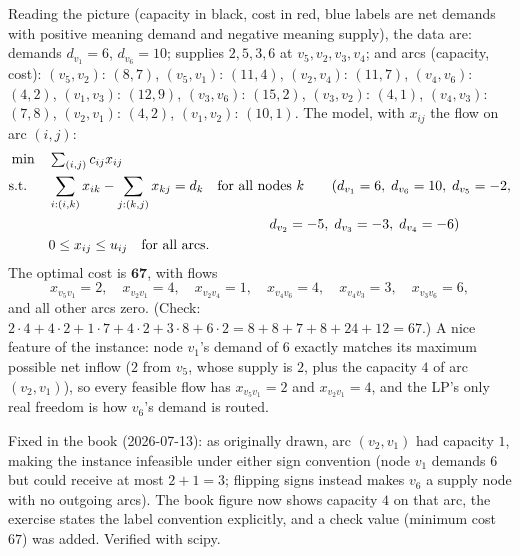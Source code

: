 Reading the picture (capacity in black, cost in red, blue labels are net demands with positive meaning demand and negative meaning supply), the data are: demands $d_{v_1} = 6$, $d_{v_6} = 10$; supplies $2, 5, 3, 6$ at $v_5, v_2, v_3, v_4$; and arcs (capacity, cost): $(v_5,v_2)$: $(8,7)$, $(v_5,v_1)$: $(11,4)$, $(v_2,v_4)$: $(11,7)$, $(v_4,v_6)$: $(4,2)$, $(v_1,v_3)$: $(12,9)$, $(v_3,v_6)$: $(15,2)$, $(v_3,v_2)$: $(4,1)$, $(v_4,v_3)$: $(7,8)$, $(v_2,v_1)$: $(4,2)$, $(v_1,v_2)$: $(10,1)$. The model, with $x_{ij}$ the flow on arc $(i,j)$:
\begin{align*}
\min \quad & \textstyle\sum_{(i,j)} c_{ij} x_{ij}\\
\st \quad & \sum_{i:(i,k)} x_{ik} - \sum_{j:(k,j)} x_{kj} = d_k \quad \text{for all nodes } k \qquad (d_{v_1} = 6,\; d_{v_6} = 10,\; d_{v_5} = -2,\\
& \hspace{16em} d_{v_2} = -5,\; d_{v_3} = -3,\; d_{v_4} = -6)\\
& 0 \leq x_{ij} \leq u_{ij} \quad \text{for all arcs}.
\end{align*}
The optimal cost is $\mathbf{67}$, with flows
\[
x_{v_5 v_1} = 2, \quad x_{v_2 v_1} = 4, \quad x_{v_2 v_4} = 1, \quad x_{v_4 v_6} = 4, \quad x_{v_4 v_3} = 3, \quad x_{v_3 v_6} = 6,
\]
and all other arcs zero. (Check: $2 \cdot 4 + 4 \cdot 2 + 1 \cdot 7 + 4 \cdot 2 + 3 \cdot 8 + 6 \cdot 2 = 8 + 8 + 7 + 8 + 24 + 12 = 67$.) A nice feature of the instance: node $v_1$'s demand of $6$ exactly matches its maximum possible net inflow ($2$ from $v_5$, whose supply is $2$, plus the capacity $4$ of arc $(v_2,v_1)$), so every feasible flow has $x_{v_5 v_1} = 2$ and $x_{v_2 v_1} = 4$, and the LP's only real freedom is how $v_6$'s demand is routed.

\begin{qaflag}
Fixed in the book (2026-07-13): as originally drawn, arc $(v_2,v_1)$ had capacity $1$, making the instance infeasible under either sign convention (node $v_1$ demands $6$ but could receive at most $2 + 1 = 3$; flipping signs instead makes $v_6$ a supply node with no outgoing arcs). The book figure now shows capacity $4$ on that arc, the exercise states the label convention explicitly, and a check value (minimum cost $67$) was added. Verified with scipy.
\end{qaflag}


